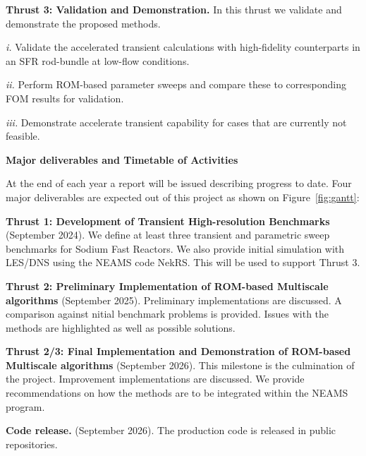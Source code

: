 \textbf{Thrust 3: Validation and Demonstration.} In this thrust we validate and demonstrate the proposed methods.
\begin{description}
\item{\em i.}
Validate the accelerated transient calculations with high-fidelity counterparts
in an SFR rod-bundle at low-flow conditions.
\item{\em ii.}
Perform ROM-based parameter sweeps and compare these to corresponding
FOM results for validation.
\item{\em iii.}
Demonstrate accelerate transient capability for cases that are currently not feasible.
\end{description}

\textbf{Major deliverables and Timetable of Activities}

At the end of each year a report will be issued describing progress to date. Four major deliverables are expected out of this project as shown on Figure~\ref{fig:gantt}:

\noindent \textbf{Thrust 1: Development of Transient High-resolution Benchmarks} (September 2024). We define at least three transient and parametric sweep benchmarks for Sodium Fast Reactors. We also provide initial simulation  with LES/DNS using the NEAMS code NekRS. This will be used to support Thrust 3.

\noindent \textbf{Thrust 2: Preliminary Implementation of ROM-based Multiscale algorithms} (September 2025). Preliminary implementations are discussed. A comparison against nitial  benchmark problems is provided. Issues with the methods are highlighted as well as possible solutions.

\noindent \textbf{Thrust 2/3: Final Implementation and Demonstration of ROM-based Multiscale algorithms} (September 2026). This milestone is the culmination of the project. Improvement implementations are discussed. We provide recommendations on how the methods are to be integrated within the NEAMS program.

\noindent \textbf{Code release.} (September 2026). The production code is released in public repositories.

